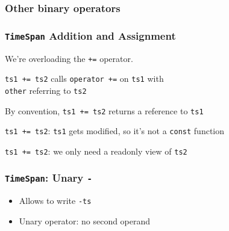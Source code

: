 \documentclass{../ucll-slides}
\begin{document}
\begin{frame}
  \frametitle{Other binary operators}
\end{frame}

\begin{frame}
  \frametitle{{\tt TimeSpan} Addition and Assignment}

  
  \begin{overprint}
    \begin{center}
      We're overloading the {\tt +=} operator.
    \end{center}

    \begin{center}
      {\tt ts1 += ts2} calls {\tt operator +=} on {\tt ts1} with \\ {\tt other} referring to {\tt ts2}
    \end{center}

    \begin{center}
      By convention, {\tt ts1 += ts2} returns a reference to {\tt ts1}
    \end{center}

    \begin{center}
      {\tt ts1 += ts2}: {\tt ts1} gets modified, so it's not a {\tt const} function
    \end{center}

    \begin{center}
      {\tt ts1 += ts2}: we only need a readonly view of {\tt ts2}
    \end{center}
  \end{overprint}
\end{frame}

\begin{frame}
  \frametitle{{\tt TimeSpan}: Unary {\tt -}}
  \begin{itemize}
    \item Allows to write {\tt -ts}
    \item Unary operator: no second operand
  \end{itemize}
\end{frame}
\end{document}
